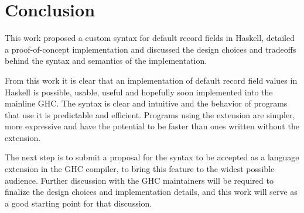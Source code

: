 \documentclass[en]{pracamgr}
\begin{document}
\chapter{Conclusion}\label{ch:concl}
This work proposed a custom syntax for default record fields in Haskell, detailed a proof-of-concept implementation and discussed the design choices
and tradeoffs behind the syntax and semantics of the implementation.

From this work it is clear that an implementation of default record field values in Haskell is possible, usable, useful and hopefully soon implemented
into the mainline GHC. The syntax is clear and intuitive and the behavior of programs that use it is predictable and efficient.
Programs using the extension are simpler, more expressive and have the potential to be faster than ones written without the extension.

The next step is to submit a proposal for the syntax to be accepted as a language extension in the GHC compiler, to bring this feature to the widest possible audience.
Further discussion with the GHC maintainers will be required to finalize the design choices and implementation details, and this work will serve
as a good starting point for that discussion.


\appendix
\end{document}
